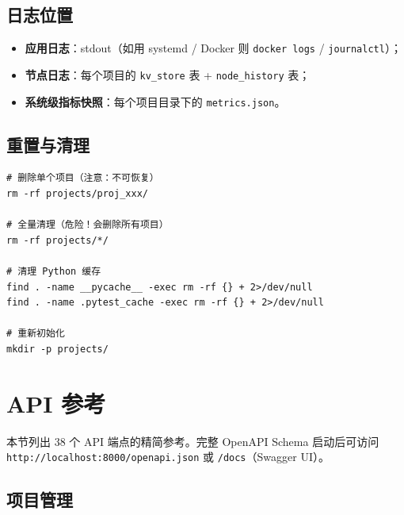 \documentclass[11pt,a4paper]{article}
\begin{document}
\subsection{日志位置}

\begin{itemize}[leftmargin=2em]
\item \textbf{应用日志}：stdout（如用 systemd / Docker 则 \texttt{docker logs} / \texttt{journalctl}）；
\item \textbf{节点日志}：每个项目的 \texttt{kv\_store} 表 + \texttt{node\_history} 表；
\item \textbf{系统级指标快照}：每个项目目录下的 \texttt{metrics.json}。
\end{itemize}

\subsection{重置与清理}

\begin{verbatim}
# 删除单个项目（注意：不可恢复）
rm -rf projects/proj_xxx/

# 全量清理（危险！会删除所有项目）
rm -rf projects/*/

# 清理 Python 缓存
find . -name __pycache__ -exec rm -rf {} + 2>/dev/null
find . -name .pytest_cache -exec rm -rf {} + 2>/dev/null

# 重新初始化
mkdir -p projects/
\end{verbatim}

\section{API 参考}

本节列出 38 个 API 端点的精简参考。完整 OpenAPI Schema 启动后可访问 \texttt{http://localhost:8000/openapi.json} 或 \texttt{/docs}（Swagger UI）。

\subsection{项目管理}
\end{document}
